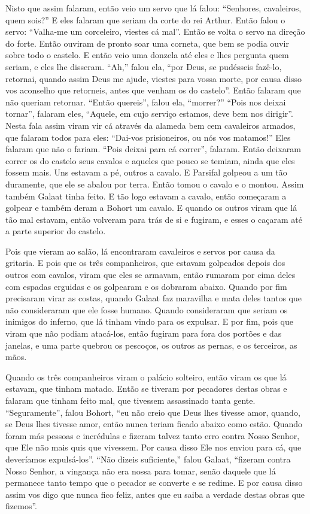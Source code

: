 Nisto que assim falaram, então veio um servo que lá falou: “Senhores,
cavaleiros, quem sois?” E eles falaram que seriam da corte do rei Arthur. Então
falou o servo: “Valha-me um corceleiro, viestes cá mal”. Então se volta o servo
na direção do forte. Então ouviram de pronto soar uma corneta, que bem se podia
ouvir sobre todo o castelo. E então veio uma donzela até eles e lhes pergunta
quem seriam, e eles lhe disseram. “Ah,” falou ela, “por Deus, se pudésseis
fazê-lo, retornai, quando assim Deus me ajude, viestes para vossa morte, por
causa disso vos aconselho que retorneis, antes que venham os do castelo”. Então
falaram que não queriam retornar. “Então quereis”, falou ela, “morrer?” “Pois
nos deixai tornar”, falaram eles, “Aquele, em cujo serviço estamos, deve bem
nos dirigir”. Nesta fala assim viram vir cá  através da alameda bem cem
cavaleiros armados, que falaram todos para eles: “Dai-vos prisioneiros, ou nós
vos matamos!” Eles falaram que não o fariam. “Pois deixai para cá correr”,
falaram. Então deixaram correr os do castelo seus cavalos e aqueles que pouco
se temiam, ainda que eles fossem mais. Uns estavam a pé, outros a cavalo. E
Parsifal golpeou a um tão duramente, que ele se abalou por terra. Então tomou
o cavalo e o montou. Assim também Galaat tinha feito. E tão logo estavam a
cavalo, então começaram a golpear e também deram a Bohort um cavalo. E quando
os outros viram que lá tão mal estavam, então volveram para trás de si e
fugiram, e esses o caçaram até a parte superior do castelo.

Pois que vieram ao salão, lá encontraram cavaleiros e servos por causa da
gritaria. E pois que os três companheiros, que estavam golpeados depois dos
outros com cavalos, viram que eles se armavam, então rumaram por cima deles com
espadas erguidas e os golpearam e os dobraram abaixo. Quando por fim precisaram
virar as costas, quando Galaat faz maravilha e mata deles tantos que não
consideraram que ele fosse humano. Quando consideraram que seriam os inimigos
do inferno, que lá tinham vindo para os expulsar. E por fim, pois que viram que
não podiam atacá-los, então fugiram para fora dos portões e das janelas, e uma
parte quebrou os pescoços, os outros as pernas, e os terceiros, as mãos. 

Quando os três companheiros viram o palácio solteiro, então viram os que lá
estavam, que tinham matado. Então se tiveram por pecadores destas obras e
falaram que tinham feito mal, que tivessem assassinado tanta gente.
“Seguramente”, falou Bohort, “eu não creio que Deus lhes tivesse amor, quando,
se Deus lhes tivesse amor, então nunca teriam ficado abaixo como estão. Quando
foram más pessoas e incrédulas e fizeram talvez tanto erro contra Nosso Senhor,
que Ele não mais quis que vivessem. Por causa disso Ele nos enviou para cá, que
deveríamos expulsá-los”. “Não dizeis suficiente,” falou Galaat, “fizeram contra
Nosso Senhor, a vingança não era nossa para tomar, senão daquele que lá
permanece tanto tempo que o pecador se converte e se redime. E por causa disso
assim vos digo que nunca fico feliz, antes que eu saiba a verdade destas obras
que fizemos”. 

